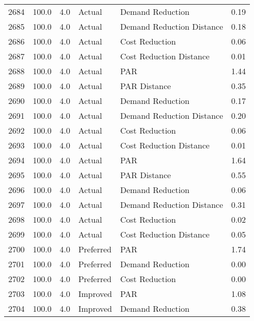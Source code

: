 \begin{longtable}{lrrllr}
2684 &        100.0 &     4.0 &         Actual &           Demand Reduction &   0.19 \\
2685 &        100.0 &     4.0 &         Actual &  Demand Reduction Distance &   0.18 \\
2686 &        100.0 &     4.0 &         Actual &             Cost Reduction &   0.06 \\
2687 &        100.0 &     4.0 &         Actual &    Cost Reduction Distance &   0.01 \\
2688 &        100.0 &     4.0 &         Actual &                        PAR &   1.44 \\
2689 &        100.0 &     4.0 &         Actual &               PAR Distance &   0.35 \\
2690 &        100.0 &     4.0 &         Actual &           Demand Reduction &   0.17 \\
2691 &        100.0 &     4.0 &         Actual &  Demand Reduction Distance &   0.20 \\
2692 &        100.0 &     4.0 &         Actual &             Cost Reduction &   0.06 \\
2693 &        100.0 &     4.0 &         Actual &    Cost Reduction Distance &   0.01 \\
2694 &        100.0 &     4.0 &         Actual &                        PAR &   1.64 \\
2695 &        100.0 &     4.0 &         Actual &               PAR Distance &   0.55 \\
2696 &        100.0 &     4.0 &         Actual &           Demand Reduction &   0.06 \\
2697 &        100.0 &     4.0 &         Actual &  Demand Reduction Distance &   0.31 \\
2698 &        100.0 &     4.0 &         Actual &             Cost Reduction &   0.02 \\
2699 &        100.0 &     4.0 &         Actual &    Cost Reduction Distance &   0.05 \\
2700 &        100.0 &     4.0 &      Preferred &                        PAR &   1.74 \\
2701 &        100.0 &     4.0 &      Preferred &           Demand Reduction &   0.00 \\
2702 &        100.0 &     4.0 &      Preferred &             Cost Reduction &   0.00 \\
2703 &        100.0 &     4.0 &       Improved &                        PAR &   1.08 \\
2704 &        100.0 &     4.0 &       Improved &           Demand Reduction &   0.38 \\

\end{longtable}

